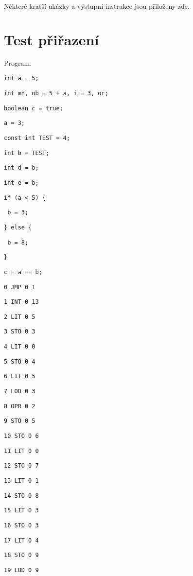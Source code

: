 \documentclass[czech]{thesiskiv}
\begin{document}
Některé kratší ukázky a výstupní instrukce jsou přiloženy zde.

\section{Test přiřazení}

Program:

\texttt{int a = 5;}

\texttt{int mn, ob = 5 + a, i = 3, or;}

\texttt{boolean c = true; }

\texttt{a = 3;}

\texttt{const int TEST = 4;}

\texttt{int b = TEST;}

\texttt{int d = b;}

\texttt{int e = b;}

\texttt{if (a < 5) \{ }

\texttt{    b = 3; }
    
\texttt{\} else \{ }

\texttt{    b = 8; }
    
\texttt{\} }

\texttt{c = a == b;}



\texttt{0	JMP	0	1}

\texttt{1	INT	0	13}

\texttt{2	LIT	0	5 }

\texttt{3	STO	0	3 }

\texttt{4	LIT	0	0 }

\texttt{5	STO	0	4 }

\texttt{6	LIT	0	5 }

\texttt{7	LOD	0	3 }

\texttt{8	OPR	0	2 }
                   
\texttt{9	STO	0	5  }

\texttt{10	STO	0	6 }

\texttt{11	LIT	0	0  }

\texttt{12	STO	0	7   }

\texttt{13	LIT	0	1    }

\texttt{14	STO	0	8     }

\texttt{15	LIT	0	3      }

\texttt{16	STO	0	3       }

\texttt{17	LIT	0	4      }

\texttt{18	STO	0	9 }

\texttt{19	LOD	0	9  }
\end{document}
